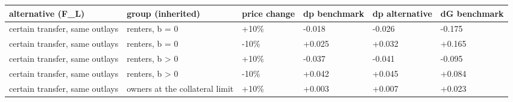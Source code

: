 \begingroup\small
\setlength{\tabcolsep}{3pt}
\renewcommand{\arraystretch}{1.04}
\begin{tabularx}{\linewidth}{XXXXXX}
\toprule
alternative (F\_L) & group (inherited) & price change & dp benchmark & dp alternative & dG benchmark \\
\midrule
certain transfer, same outlays & renters, b = 0 & +10\% & -0.018 & -0.026 & -0.175 \\
certain transfer, same outlays & renters, b = 0 & -10\% & +0.025 & +0.032 & +0.165 \\
certain transfer, same outlays & renters, b \textgreater{} 0 & +10\% & -0.037 & -0.041 & -0.095 \\
certain transfer, same outlays & renters, b \textgreater{} 0 & -10\% & +0.042 & +0.045 & +0.084 \\
certain transfer, same outlays & owners at the collateral limit & +10\% & +0.003 & +0.007 & +0.023 \\
\bottomrule
\end{tabularx}
\endgroup
